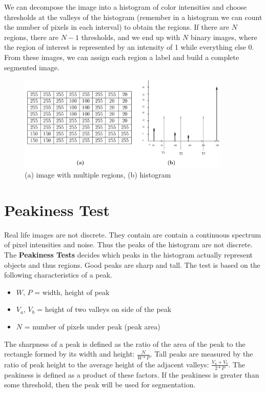 \documentclass{article}
\begin{document}
We can decompose the image into a histogram of color intensities and choose thresholds at the valleys of the histogram (remember in a histogram we can count the number of pixels in each interval) to obtain the regions. If there are $N$ regions, there are $N-1$ thresholds, and we end up with $N$ binary images, where the region of interest is represented by an intensity of 1 while everything else 0. From these images, we can assign each region a label and build a complete segmented image.

\begin{figure}[!htb]
    \begin{center}
        \includegraphics[width=0.9\textwidth]{L5F3.png}
        \vspace{-20pt}
    \end{center}
    \caption{(a) image with multiple regions, (b) histogram}
\end{figure}
\noindent

\section{Peakiness Test}
Real life images are not discrete. They contain are contain a continuous spectrum of pixel intensities and noise. Thus the peaks of the histogram are not discrete. The \textbf{Peakiness Tests} decides which peaks in the histogram actually represent objects and thus regions. Good peaks are sharp and tall. The test is based on the following characteristics of a peak.

\begin{itemize}
    \item $W$, $P$ = width, height of peak
    \item $V_a$, $V_b$ = height of two valleys on side of the peak
    \item $N$ = number of pixels under peak (peak area)
\end{itemize}

\noindent
The sharpness of a peak is defined as the ratio of the area of the peak to the rectangle formed by its width and height: $\frac{N}{W * P}$. Tall peaks are measured by the ratio of peak height to the average height of the adjacent valleys: $\frac{V_a+V_b}{2*P}$. The peakiness is defined as a product of these factors. If the peakiness is greater than some threshold, then the peak will be used for segmentation.
\end{document}
